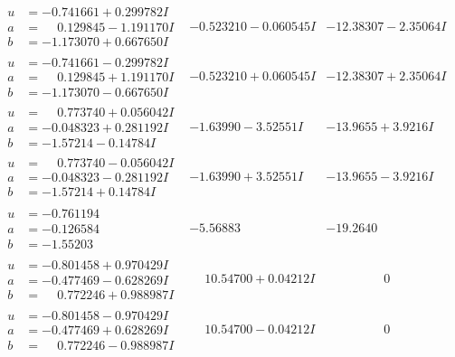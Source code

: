 \documentclass[1p]{elsarticle_modified}
\theoremstyle{definition}
\begin{document}
$$\begin{array}{c|c|c}
\begin{aligned}
u &= -0.741661 + 0.299782 I \\
a &= \phantom{-}0.129845 - 1.191170 I \\
b &= -1.173070 + 0.667650 I\end{aligned}
 & -0.523210 - 0.060545 I & -12.38307 - 2.35064 I \\ \hline\begin{aligned}
u &= -0.741661 - 0.299782 I \\
a &= \phantom{-}0.129845 + 1.191170 I \\
b &= -1.173070 - 0.667650 I\end{aligned}
 & -0.523210 + 0.060545 I & -12.38307 + 2.35064 I \\ \hline\begin{aligned}
u &= \phantom{-}0.773740 + 0.056042 I \\
a &= -0.048323 + 0.281192 I \\
b &= -1.57214 - 0.14784 I\end{aligned}
 & -1.63990 - 3.52551 I & -13.9655 + 3.9216 I \\ \hline\begin{aligned}
u &= \phantom{-}0.773740 - 0.056042 I \\
a &= -0.048323 - 0.281192 I \\
b &= -1.57214 + 0.14784 I\end{aligned}
 & -1.63990 + 3.52551 I & -13.9655 - 3.9216 I \\ \hline\begin{aligned}
u &= -0.761194\phantom{ +0.000000I} \\
a &= -0.126584\phantom{ +0.000000I} \\
b &= -1.55203\phantom{ +0.000000I}\end{aligned}
 & -5.56883\phantom{ +0.000000I} & -19.2640\phantom{ +0.000000I} \\ \hline\begin{aligned}
u &= -0.801458 + 0.970429 I \\
a &= -0.477469 - 0.628269 I \\
b &= \phantom{-}0.772246 + 0.988987 I\end{aligned}
 & \phantom{-}10.54700 + 0.04212 I & \phantom{-0.000000 } 0 \\ \hline\begin{aligned}
u &= -0.801458 - 0.970429 I \\
a &= -0.477469 + 0.628269 I \\
b &= \phantom{-}0.772246 - 0.988987 I\end{aligned}
 & \phantom{-}10.54700 - 0.04212 I & \phantom{-0.000000 } 0 \\ \hline\begin{aligned}

\end{aligned}
\end{array}$$
\end{document}
